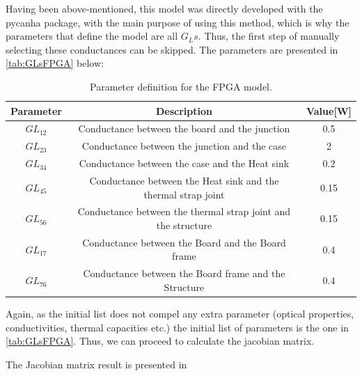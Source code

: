 Having been above-mentioned, this model was directly developed with the pycanha package, with the main purpose of using this method, which is why the parameters that define the model are all $G_Ls$. Thus, the first step of manually selecting these conductances can be skipped. The parameters are presented in \autoref{tab:GLsFPGA} below:

\begin{table}[H]
\centering
\caption{Parameter definition for the FPGA model.}
\label{tab:GLsFPGA}

\begin{tabular}{c c c}
\toprule
\multicolumn{1}{c}{\textbf{Parameter}} & \multicolumn{1}{c}{\textbf{Description}} & \multicolumn{1}{c}{\textbf{Value}[W]} \\ \midrule
$GL_{12}$  & Conductance between the board and the junction  & 0.5 \\ 
$GL_{23}$  & Conductance between the junction and the case  &  2\\ 
$GL_{34}$  & Conductance between the case and the Heat sink  & 0.2 \\ 
$GL_{45}$  & Conductance between the Heat sink and the thermal strap joint  & 0.15 \\ 
$GL_{56}$  & Conductance between the thermal strap joint and the structure  & 0.15 \\ 
$GL_{17}$  & Conductance between the Board and the Board frame  & 0.4 \\ 
$GL_{76}$  & Conductance between the Board frame and the Structure  & 0.4 \\ \bottomrule
\end{tabular}
\end{table}

Again, as the initial list does not compel any extra parameter (optical properties, conductivities, thermal capacities etc.) the initial list of parameters is the one in \autoref{tab:GLsFPGA}. Thus, we can proceed to calculate the jacobian matrix.

The Jacobian matrix result is presented in 


